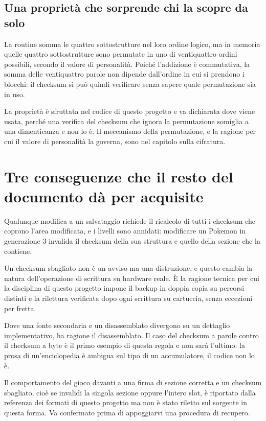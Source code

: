 \subsection{Una proprietà che sorprende chi la scopre da solo}

La routine somma le quattro sottostrutture nel loro ordine logico, ma in memoria quelle
quattro sottostrutture sono permutate in uno di ventiquattro ordini possibili, secondo il
valore di personalità. Poiché l'addizione è commutativa, la somma delle ventiquattro parole
non dipende dall'ordine in cui si prendono i blocchi: il checksum si può quindi verificare
senza sapere quale permutazione sia in uso.

La proprietà è sfruttata nel codice di questo progetto e va dichiarata dove viene usata,
perché una verifica del checksum che ignora la permutazione somiglia a una dimenticanza e
non lo è. Il meccanismo della permutazione, e la ragione per cui il valore di personalità
la governa, sono nel capitolo sulla cifratura.

\section{Tre conseguenze che il resto del documento dà per acquisite}

Qualunque modifica a un salvataggio richiede il ricalcolo di tutti i checksum che coprono
l'area modificata, e i livelli sono annidati: modificare un Pokemon in generazione 3
invalida il checksum della sua struttura e quello della sezione che la contiene.

Un checksum sbagliato non è un avviso ma una distruzione, e questo cambia la natura
dell'operazione di scrittura su hardware reale. È la ragione tecnica per cui la disciplina
di questo progetto impone il backup in doppia copia su percorsi distinti e la rilettura
verificata dopo ogni scrittura su cartuccia, senza eccezioni per fretta.

Dove una fonte secondaria e un disassemblato divergono su un dettaglio implementativo, ha
ragione il disassemblato. Il caso del checksum a parole contro il checksum a byte è il
primo esempio di questa regola e non sarà l'ultimo: la prosa di un'enciclopedia è ambigua
sul tipo di un accumulatore, il codice non lo è.

\begin{daverificare}
Il comportamento del gioco davanti a una firma di sezione corretta e un checksum sbagliato,
cioè se invalidi la singola sezione oppure l'intero slot, è riportato dalla referenza dei
formati di questo progetto ma non è stato riletto sul sorgente in questa forma. Va
confermato prima di appoggiarvi una procedura di recupero.
\end{daverificare}
